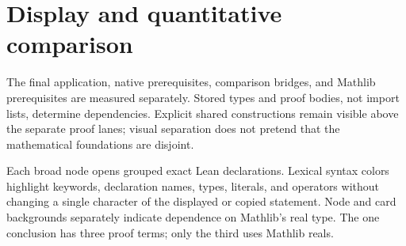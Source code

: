 \section{Display and quantitative comparison}
The final application, native prerequisites, comparison bridges, and Mathlib
prerequisites are measured separately. Stored types and proof bodies, not
import lists, determine dependencies. Explicit shared constructions remain
visible above the separate proof lanes; visual separation does not pretend
that the mathematical foundations are disjoint.

Each broad node opens grouped exact Lean declarations. Lexical syntax colors
highlight keywords, declaration names, types, literals, and operators without
changing a single character of the displayed or copied statement. Node and
card backgrounds separately indicate dependence on Mathlib's real type.
The one conclusion has three proof terms; only the third uses Mathlib reals.

